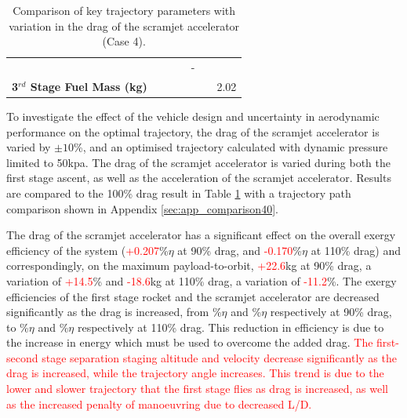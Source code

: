 \begin{table}[ht!]
\begin{tabular}{l c c c c c c}
		& \thirdqOverFiveCdStandardNoReturn
		& \thirdqOverFiveCdOneHundredFiveNoReturn
		& \thirdqOverFiveCdOneHundredTenNoReturn
		& -
		\\
		\textbf{3$^{rd}$ Stage Fuel Mass (kg)}
		& \thirdmFuelCdNinetyNoReturn
		& \thirdmFuelCdNinetyFiveNoReturn
		& \thirdmFuelCdStandardNoReturn
		& \thirdmFuelCdOneHundredFiveNoReturn
		& \thirdmFuelCdOneHundredTenNoReturn
		&2.02
		\\
		\hline 
	\end{tabular} 
	\caption{Comparison of key trajectory parameters with variation in the drag of the scramjet accelerator (Case 4).}
	\label{tab:DragVariationNoReturn}
\end{table}

To investigate the effect of the vehicle design and uncertainty in aerodynamic performance on the optimal trajectory, the drag of the scramjet accelerator is varied by $\pm10$\%, and an optimised trajectory calculated with dynamic pressure limited to 50kpa. The drag of the scramjet accelerator is varied during both the first stage ascent, as well as the acceleration of the scramjet accelerator. Results are compared to the 100\% drag result in Table \ref{tab:DragVariationNoReturn} with a trajectory path comparison shown in Appendix \ref{sec:app_comparison40}. 

The drag of the scramjet accelerator has a significant effect on the overall exergy efficiency of the system (\textcolor{red}{+0.207}\%$\eta$ at 90\% drag, and \textcolor{red}{-0.170}\%$\eta$ at 110\% drag) and correspondingly, on the maximum payload-to-orbit, \textcolor{red}{+22.6}kg at 90\% drag, a variation of \textcolor{red}{+14.5}\% and \textcolor{red}{-18.6}kg at 110\% drag, a variation of \textcolor{red}{-11.2}\%. The exergy efficiencies of the first stage rocket and the scramjet accelerator are decreased significantly as the drag is increased, from \firstExergyEffCdNinetyNoReturn\%$\eta$ and \secondExergyEffCdNinetyNoReturn\%$\eta$ respectively at 90\% drag, to \firstExergyEffCdOneHundredTenNoReturn\%$\eta$ and \secondExergyEffCdOneHundredTenNoReturn\%$\eta$ respectively at 110\% drag. This reduction in efficiency is due to the increase in energy which must be used to overcome the added drag. 
\textcolor{red}{
The first-second stage separation staging altitude and velocity decrease significantly as the drag is increased, while the trajectory angle increases. This trend is due to the lower and slower trajectory that the first stage flies as drag is increased, as well as the increased penalty of manoeuvring due to decreased L/D. }


